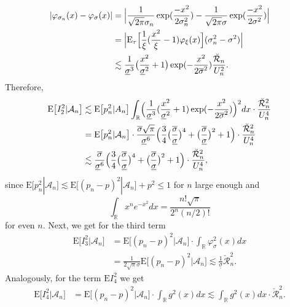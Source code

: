 \documentclass[a4paper,11pt]{article}
\theoremstyle{definition}
\newcommand{\R}{{\mathbb{R}}}
\newcommand{\1}{\mathbb{I}}
\newcommand{\A}{\mathscr{A}}
\renewcommand{\A}{\mathcal{A}}
\newcommand{\E}{{\mathrm E}}
\def\R{\mathbb{R}}
\theoremstyle{remark}
\begin{document}
\begin{align*}
    |\varphi_{\sigma_n}(x) - \varphi_{\sigma}(x) | &= \Bigl|\frac{1}{\sqrt{2\pi}\sigma_n}\exp(\frac{-x^2}{2\sigma^2_n}) - \frac{1}{\sqrt{2\pi}\sigma}\exp(\frac{-x^2}{2\sigma^2})\Bigr| \\
    &= \Bigl|\E_{\tau}\Bigl[\frac{1}{\xi}(\frac{x^2}{\xi} - 1)\varphi_{\xi}(x)\Bigr](\sigma^2_n - \sigma^2)\Bigr| \\
    &\lesssim \frac{1}{\underline{\sigma}^3}\bigl(\frac{x^2}{\underline{\sigma}^2} + 1\bigr) \exp(-\frac{x^2}{2\overline{\sigma}^2}) \frac{\breve{\mathcal{R}}_n}{U_n^2}.
\end{align*}
Therefore, 
\begin{align}\label{thm3_proof4}
    \E \bigl[ I^2_2 | \A_n \bigr] &\lesssim  \E \bigl[p_n^2 | A_n \bigr]\int_{\R} \Bigl( \frac{1}{\underline{\sigma}^3}(\frac{x^2}{\underline{\sigma}^2} + 1)\exp(-\frac{x^2}{2\overline{\sigma}^2})\Bigr)^2 dx \cdot \frac{\breve{\mathcal{R}}_n^2}{U_n^4} \nonumber \\
    &=   \E \bigl[p_n^2 | \A_n \bigr] \cdot \frac{\overline{\sigma}\sqrt{\pi}}{\underline{\sigma}^6}\Bigl(\frac{3}{4}\bigl(\frac{\overline{\sigma}}{\underline{\sigma}}\bigr)^4 +\bigl(\frac{\overline{\sigma}}{\underline{\sigma}}\bigr)^2 + 1\Bigr)  \cdot \frac{\breve{\mathcal{R}}_n^2}{U_n^4}  \nonumber \\
    &\lesssim  \frac{\overline{\sigma}}{\underline{\sigma}^6}\Bigl(\frac{3}{4}\bigl(\frac{\overline{\sigma}}{\underline{\sigma}}\bigr)^4 +\bigl(\frac{\overline{\sigma}}{\underline{\sigma}}\bigr)^2 + 1\Bigr) \cdot \frac{\breve{\mathcal{R}}_n^2}{U_n^4} ,
\end{align}
since \(\E \bigl[p_n^2 | \A_n \bigr]  \lesssim\E \bigl[(p_n - p )^2 | \A_n \bigr] + p^2 \leq 1\) for \(n\) large enough and 
\begin{equation*}
	\int_{\R} x^ne^{-x^2}dx = \frac{n!\sqrt{\pi}}{2^n(n/2)!}
\end{equation*} for even $n$.  Next, we get for the third term
\begin{align}\label{thm3_proof3}
    \E \bigl[ I_3^2 | \A_n \bigr] &= \E \bigl[ (p_n - p)^2 | \A_n \bigr] \cdot \int_{\R} \varphi^2_{\sigma}(x)dx
    \nonumber \\
    &= \frac{1}{2\sqrt{\pi}\sigma}\E \bigl[ (p_n - p)^2 | \A_n \bigr] \lesssim \frac{1}{\underline{\sigma}}\breve{\mathcal{R}}_n^2.\end{align}
Analogously, for the term $\E I^2_4$ we get
\begin{align}\label{thm3_proof4}
    \E \bigl[ I_4^2 | \A_n \bigr] &= \E \bigl[ (p_n - p)^2 | \A_n \bigr] \cdot \int_{\R} g^2(x)dx   \lesssim  \int_{\R} g^2(x) dx \cdot \breve{\mathcal{R}}_n^2.
\end{align}
\end{document}
